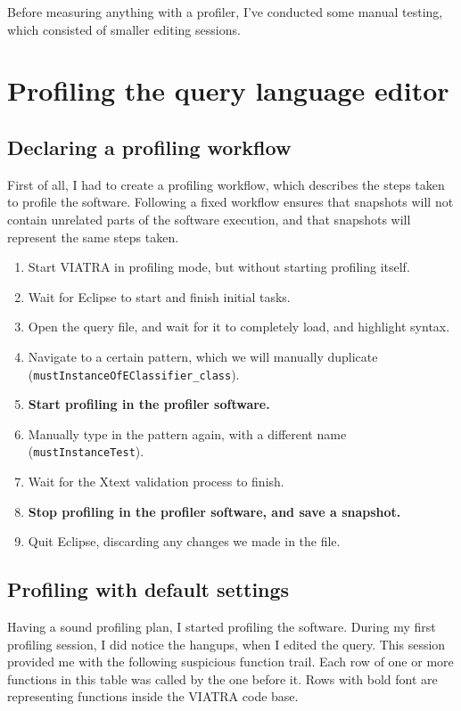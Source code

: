 \documentclass[11pt,a4paper,oneside]{report}
\begin{document}
Before measuring anything with a profiler, I've conducted some manual testing,
which consisted of smaller editing sessions.

\section{Profiling the query language editor}
\subsection{Declaring a profiling workflow}
First of all, I had to create a profiling workflow, which describes the steps
taken to profile the software. Following a fixed workflow ensures that snapshots
will not contain unrelated parts of the software execution, and that snapshots
will represent the same steps taken.

\begin{enumerate}
    \item{Start VIATRA in profiling mode, but without starting profiling itself.}
    \item{Wait for Eclipse to start and finish initial tasks.}
    \item{Open the query file, and wait for it to completely load, and highlight syntax.}
    \item{
        Navigate to a certain pattern, which we will manually duplicate
        (\texttt{mustInstanceOfEClassifier\_class}).
    }
    \item{\textbf{Start profiling in the profiler software.}}
    \item{
        Manually type in the pattern again, with a different name
        (\texttt{mustInstanceTest}).
    }
    \item{Wait for the Xtext validation process to finish.}
    \item{\textbf{Stop profiling in the profiler software, and save a snapshot.}}
    \item{Quit Eclipse, discarding any changes we made in the file.}
\end{enumerate}

\subsection{Profiling with default settings}
Having a sound profiling plan, I started profiling the software. During my
first profiling session, I did notice the hangups, when I edited the query. This
session provided me with the following suspicious function trail. Each row of
one or more functions in this table was called by the one before it. Rows with
bold font are representing functions inside the VIATRA code base.
\end{document}
